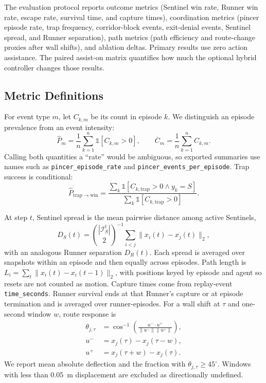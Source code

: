 \documentclass[journal]{IEEEtran}
\begin{document}
The evaluation protocol reports outcome metrics (Sentinel win rate, Runner win rate, escape rate, survival time, and capture times), coordination metrics (pincer episode rate, trap frequency, corridor-block events, exit-denial events, Sentinel spread, and Runner separation), path metrics (path efficiency and route-change proxies after wall shifts), and ablation deltas. Primary results use zero action assistance. The paired assist-on matrix quantifies how much the optional hybrid controller changes those results.

\subsection{Metric Definitions}

For event type $m$, let $C_{k,m}$ be its count in episode $k$. We distinguish an episode prevalence from an event intensity:
\begin{equation}
\widehat{P}_m=\frac{1}{n}\sum_{k=1}^{n}\mathbb{1}[C_{k,m}>0],\qquad
\overline{C}_m=\frac{1}{n}\sum_{k=1}^{n}C_{k,m}.
\end{equation}
Calling both quantities a ``rate'' would be ambiguous, so exported summaries use names such as \texttt{pincer\_episode\_rate} and \texttt{pincer\_events\_per\_episode}. Trap success is conditional:
\begin{equation}
\widehat{P}_{\mathrm{trap\to win}}=
\frac{\sum_k\mathbb{1}[C_{k,\mathrm{trap}}>0\land y_k=S]}
{\sum_k\mathbb{1}[C_{k,\mathrm{trap}}>0]}.
\end{equation}

At step $t$, Sentinel spread is the mean pairwise distance among active Sentinels,
\begin{equation}
D_S(t)=\binom{|\mathcal{I}_S^t|}{2}^{-1}\sum_{i<j}\|x_i(t)-x_j(t)\|_2,
\end{equation}
with an analogous Runner separation $D_R(t)$. Each spread is averaged over snapshots within an episode and then equally across episodes. Path length is $L_i=\sum_t\|x_i(t)-x_i(t-1)\|_2$, with positions keyed by episode and agent so resets are not counted as motion. Capture times come from replay-event \texttt{time\_seconds}. Runner survival ends at that Runner's capture or at episode termination and is averaged over runner-episodes. For a wall shift at $\tau$ and one-second window $w$, route response is
\begin{equation}
\begin{aligned}
\theta_{j,\tau}&=\cos^{-1}\!\left(\frac{u^-\!\cdot u^+}{\|u^-\|\|u^+\|}\right),\\
u^-&=x_j(\tau)-x_j(\tau-w),\\
u^+&=x_j(\tau+w)-x_j(\tau).
\end{aligned}
\end{equation}
We report mean absolute deflection and the fraction with $\theta_{j,\tau}\ge45^\circ$. Windows with less than 0.05~m displacement are excluded as directionally undefined.
\end{document}
